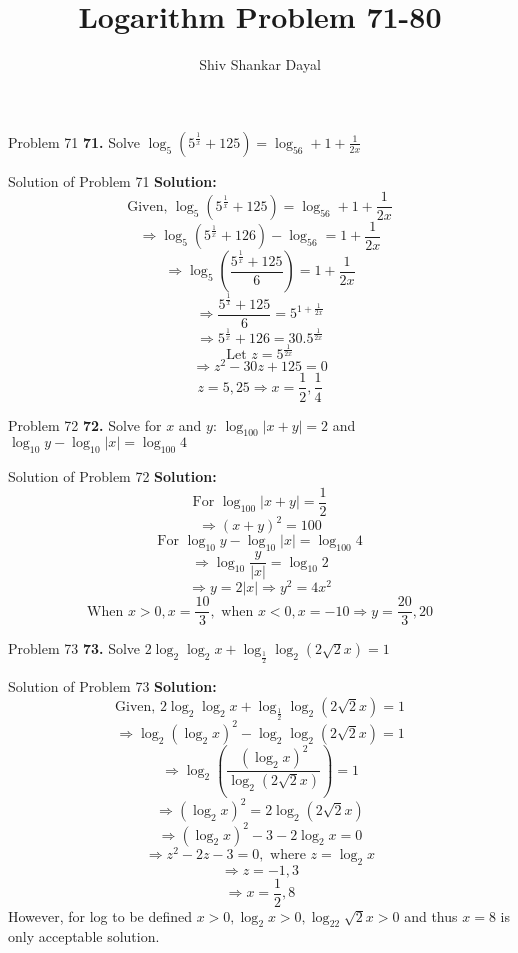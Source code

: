 \documentclass[aspectratio=1610,8pt]{beamer}
\title{Logarithm Problem 71-80}
\author[Shiv Shankar Dayal]{Shiv Shankar Dayal}
\begin{document}
\begin{frame}
  \titlepage
\end{frame}
\begin{frame}{Problem 71}
  \textbf{71.} Solve $\log_5\left(5^{\frac{1}{x}} + 125\right) = \log_56 + 1 + \frac{1}{2x}$
\end{frame}
\begin{frame}{Solution of Problem 71}
  \textbf{Solution:} $$\text{Given,~}\log_5\left(5^{\frac{1}{x}} + 125\right) = \log_56 + 1 + \frac{1}{2x}$$
  $$\Rightarrow \log_5\left(5^{\frac{1}{x}} + 126\right) - \log_56 = 1 + \frac{1}{2x}$$
  $$\Rightarrow \log_5\left(\frac{5^{\frac{1}{x}} + 125}{6}\right) = 1 + \frac{1}{2x}$$
  $$\Rightarrow \frac{5^{\frac{1}{x}} + 125}{6} = 5^{1 + \frac{1}{2x}}$$
  $$\Rightarrow 5^{\frac{1}{x}} + 126 = 30.5^{\frac{1}{2x}}$$
  $$\text{Let~}z=5^{\frac{1}{2x}}$$
  $$\Rightarrow z^2 - 30z + 125 = 0$$
  $$z = 5, 25 \Rightarrow x = \frac{1}{2}, \frac{1}{4}$$
\end{frame}
\begin{frame}{Problem 72}
  \textbf{72.} Solve for $x$ and $y$: $\log_{100}|x + y| = 2$ and $\log_{10}y - \log_{10}|x| = \log_{100}4$
\end{frame}
\begin{frame}{Solution of Problem 72}
  \textbf{Solution:} $$\text{For~}\log_{100}|x + y| = \frac{1}{2}$$
  $$\Rightarrow (x + y)^2 = 100$$
  $$\text{For~}\log_{10}y - \log_{10}|x| = \log_{100}4$$
  $$\Rightarrow \log_{10}\frac{y}{|x|} = \log_{10}2$$
  $$\Rightarrow y = 2|x|\Rightarrow y^2 = 4x^2$$
  $$\text{When~} x>0, x = \frac{10}{3}, \text{~when~} x<0, x = -10\Rightarrow y = \frac{20}{3}, 20$$
\end{frame}
\begin{frame}{Problem 73}
  \textbf{73.} Solve $2\log_2\log_2x + \log_{\frac{1}{2}}\log_2(2\sqrt{2}x) = 1$
\end{frame}
\begin{frame}{Solution of Problem 73}
  \textbf{Solution:} $$\text{Given,~}2\log_2\log_2x + \log_{\frac{1}{2}}\log_2(2\sqrt{2}x) = 1$$
  $$\Rightarrow \log_2(\log_2x)^2 - \log_2\log_2(2\sqrt{2}x)=1$$
  $$\Rightarrow \log_2\left(\frac{(\log_2x)^2}{\log_2(2\sqrt{2}x)}\right) = 1$$
  $$\Rightarrow (\log_2x)^2 = 2\log_2(2\sqrt{2}x)$$
  $$\Rightarrow (\log_2x)^2 - 3 - 2\log_2x = 0$$
  $$\Rightarrow z^2 - 2z - 3 = 0,\text{~where~}z=\log_2x$$
  $$\Rightarrow z = -1, 3$$
  $$\Rightarrow x = \frac{1}{2}, 8$$
  However, for log to be defined $x > 0,\log_2x>0, \log_22\sqrt{2}x > 0$ and thus $x =8$ is only acceptable solution.
\end{frame}
\end{document}
